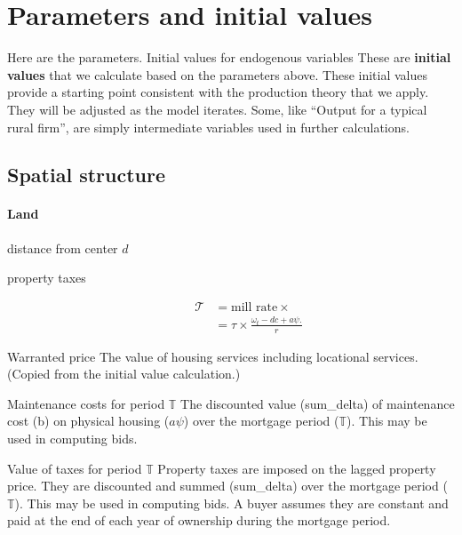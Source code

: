 \chapter{Parameters and initial values} \label{appendix-parameters}

Here are the parameters.
Initial values for endogenous variables
These are \textbf{initial values} that we calculate based on the parameters above. These initial values provide  a starting point consistent with the production theory that we apply. They will be adjusted as the model iterates.  Some, like ``Output for a typical rural firm'', are simply intermediate variables used in further calculations.%



\section{Spatial structure}

\subsubsection{Land}
\begin{description}
\item[distance from center  $d$] 
\end{description}


\begin{description}
\item[property taxes]
\begin{align*}
\mathcal{T} &= \text{mill rate} \times  \\
&= \tau \times \frac{\omega_t- {dc} + a\psi.}{r}
\end{align*}
\end{description}



{Warranted price} The value of housing services including locational services. (Copied from the initial value calculation.)

{Maintenance costs for period $\mathbb{T}$} The discounted value (sum\_delta) of maintenance cost (b) on  physical housing ($a\psi$) over the mortgage period ($\mathbb{T}$). This may be used in computing bids.

{Value of taxes for period $\mathbb{T}$}
Property taxes are imposed on the  lagged property price. They  are discounted and summed (sum\_delta)  over the mortgage period ($\mathbb{T}$). This may be used in computing bids. A buyer assumes they are constant and paid at the end of each year of ownership during the mortgage period.


